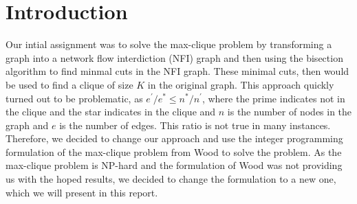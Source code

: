 \documentclass{article}
\begin{document}


\section{Introduction}
Our intial assignment was to solve the max-clique problem by transforming a graph into a network flow interdiction (NFI) graph and then using the bisection algorithm to find minmal cuts in the NFI graph. These minimal cuts, then would be used to find a clique of size $K$ in the original graph. This approach quickly turned out to be problematic, as $e^{'}/e^{*} \leq n^{*}/n^{'}$, where the prime indicates not in the clique and the star indicates in the clique and $n$ is the number of nodes in the graph and $e$ is the number of edges. This ratio is not true in many instances. Therefore, we decided to change our approach and use the integer programming formulation of the max-clique problem from Wood to solve the problem. As the max-clique problem is NP-hard and the formulation of Wood was not providing us with the hoped results, we decided to change the formulation to a new one, which we will present in this report.
\end{document}
